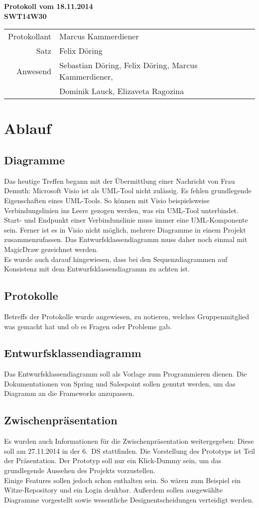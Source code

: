 \documentclass{scrartcl}
\begin{document}
\begin{center}
\LARGE \bf{Protokoll vom 18.11.2014 \\
SWT14W30}
\end{center}

\begin{tabular}{rp{10cm}}
Protokollant & Marcus Kammerdiener \\
Satz & Felix Döring \\
Anwesend & Sebastian Döring, Felix Döring, Marcus Kammerdiener,\\
& Dominik Lauck, Elizaveta Ragozina \\
\end{tabular}

\vspace*{3em}

\section{Ablauf}
\subsection{Diagramme}
Das heutige Treffen begann mit der Übermittlung einer Nachricht von Frau Demuth: Microsoft Visio ist als UML-Tool nicht zulässig. Es fehlen grundlegende Eigenschaften eines UML-Tools. So können mit Visio beispielsweise Verbindungslinien ins Leere gezogen werden, was ein UML-Tool unterbindet. Start- und Endpunkt einer Verbindunslinie muss immer eine UML-Komponente sein. Ferner ist es in Visio nicht möglich, mehrere Diagramme in einem Projekt zusammenzufassen. Das Entwurfsklassendiagramm muss daher noch einmal mit MagicDraw gezeichnet werden. \\
Es wurde auch darauf hingewiesen, dass bei den Sequenzdiagrammen auf Konsistenz mit dem Entwurfsklassendiagramm zu achten ist.
\subsection{Protokolle}
Betreffs der Protokolle wurde angewiesen, zu notieren, welches Gruppenmitglied was gemacht hat und ob es Fragen oder Probleme gab.
\subsection{Entwurfsklassendiagramm}
Das Entwurfsklassendiagramm soll als Vorlage zum Programmieren dienen. Die Dokumentationen von Spring und Salespoint sollen genutzt werden, um das Diagramm an die Frameworks anzupassen.
\subsection{Zwischenpräsentation}
Es wurden auch Informationen für die Zwischenpräsentation weitergegeben: Diese soll am 27.11.2014 in der 6.~DS stattfinden. Die Vorstellung des Prototyps ist Teil der Präsentation. Der Prototyp soll nur ein Klick-Dummy sein, um das grundlegende Aussehen des Projekts vorzustellen. \\
Einige Features sollen jedoch schon enthalten sein. So wären zum Beispiel ein Witze-Repository und ein Login denkbar. Außerdem sollen ausgewählte Diagramme vorgestellt sowie wesentliche Designentscheidungen verteidigt werden.
\end{document}
